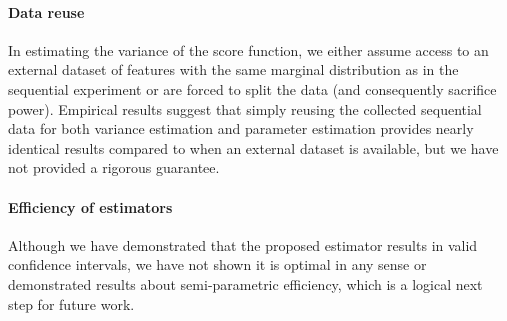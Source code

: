 \documentclass[11pt]{article}
\begin{document}
\paragraph{Data reuse}
In estimating the variance of the score function, we either assume access to an external dataset of features with the same marginal distribution as in the sequential experiment or are forced to split the data (and consequently sacrifice power). Empirical results suggest that simply reusing the collected sequential data for both variance estimation and parameter estimation provides nearly identical results compared to when an external dataset is available, but we have not provided a rigorous guarantee.

\paragraph{Efficiency of estimators} Although we have demonstrated that the proposed estimator results in valid confidence intervals, we have not shown it is optimal in any sense or demonstrated results about semi-parametric efficiency, which is a logical next step for future work.  
\end{document}
